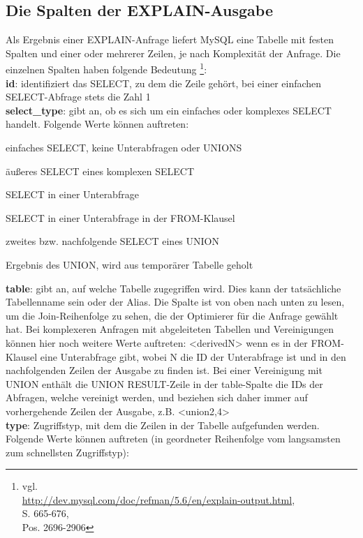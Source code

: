 \subsection{Die Spalten der EXPLAIN-Ausgabe}
Als Ergebnis einer EXPLAIN-Anfrage liefert MySQL eine Tabelle mit festen Spalten und einer oder mehrerer Zeilen, je nach Komplexität der Anfrage. Die einzelnen Spalten haben folgende Bedeutung  \footnote{vgl. \cite{manual} \\ \url{http://dev.mysql.com/doc/refman/5.6/en/explain-output.html},\\ \cite{Schwartz2009} S. 665-676, \\ \cite{Bradford2011} Pos. 2696-2906}:\\
\textbf{id}: identifiziert das SELECT, zu dem die Zeile gehört, bei einer einfachen SELECT-Abfrage stets die Zahl 1\\
\textbf{select\_type}: gibt an, ob es sich um ein einfaches oder komplexes SELECT handelt. Folgende Werte können auftreten:
\begin{description}[labelwidth=90pt,font=\ttfamily]
	\item[SIMPLE] einfaches SELECT, keine Unterabfragen oder UNIONS
	\item[PRIMARY] äußeres SELECT eines komplexen SELECT
	\item[SUBQUERY] SELECT in einer Unterabfrage
	\item[DERIVED] SELECT in einer Unterabfrage in der FROM-Klausel
	\item[UNION] zweites bzw. nachfolgende SELECT eines UNION
	\item[UNION RESULT] Ergebnis des UNION, wird aus temporärer Tabelle geholt
\end{description}
\textbf{table}: gibt an, auf welche Tabelle zugegriffen wird. Dies kann der tatsächliche Tabellenname sein oder der Alias. Die Spalte ist von oben nach unten zu lesen, um die Join-Reihenfolge zu sehen, die der Optimierer für die Anfrage gewählt hat.
Bei komplexeren Anfragen mit abgeleiteten Tabellen und Vereinigungen können hier noch weitere Werte auftreten: <derivedN> wenn es in der FROM-Klausel eine Unterabfrage gibt, wobei N die ID der Unterabfrage ist und in den nachfolgenden Zeilen der Ausgabe zu finden ist. Bei einer Vereinigung mit UNION enthält die UNION RESULT-Zeile in der table-Spalte die IDs der Abfragen, welche vereinigt werden, und beziehen sich daher immer auf vorhergehende Zeilen der Ausgabe, z.B. <union2,4>\\
\textbf{type}: Zugriffstyp, mit dem die Zeilen in der Tabelle aufgefunden werden. Folgende Werte können auftreten (in geordneter Reihenfolge vom langsamsten zum schnellsten Zugriffstyp):
